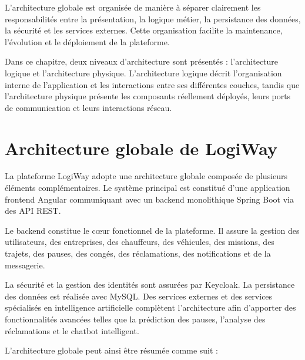 \documentclass[12pt,a4paper]{report}
\begin{document}
L'architecture globale est organisée de manière à séparer clairement les
responsabilités entre la présentation, la logique métier, la persistance des
données, la sécurité et les services externes. Cette organisation facilite la
maintenance, l'évolution et le déploiement de la plateforme.

Dans ce chapitre, deux niveaux d'architecture sont présentés : l'architecture
logique et l'architecture physique. L'architecture logique décrit
l'organisation interne de l'application et les interactions entre ses
différentes couches, tandis que l'architecture physique présente les
composants réellement déployés, leurs ports de communication et leurs
interactions réseau.

\section{Architecture globale de LogiWay}
\label{sec:ch2-archi-globale}

La plateforme LogiWay adopte une architecture globale composée de plusieurs
éléments complémentaires. Le système principal est constitué d'une
application frontend Angular communiquant avec un backend monolithique
Spring Boot via des API REST.

Le backend constitue le cœur fonctionnel de la plateforme. Il assure la
gestion des utilisateurs, des entreprises, des chauffeurs, des véhicules,
des missions, des trajets, des pauses, des congés, des réclamations, des
notifications et de la messagerie.

La sécurité et la gestion des identités sont assurées par Keycloak. La
persistance des données est réalisée avec MySQL. Des services externes et des
services spécialisés en intelligence artificielle complètent l'architecture
afin d'apporter des fonctionnalités avancées telles que la prédiction des
pauses, l'analyse des réclamations et le chatbot intelligent.

L'architecture globale peut ainsi être résumée comme suit :
\end{document}
